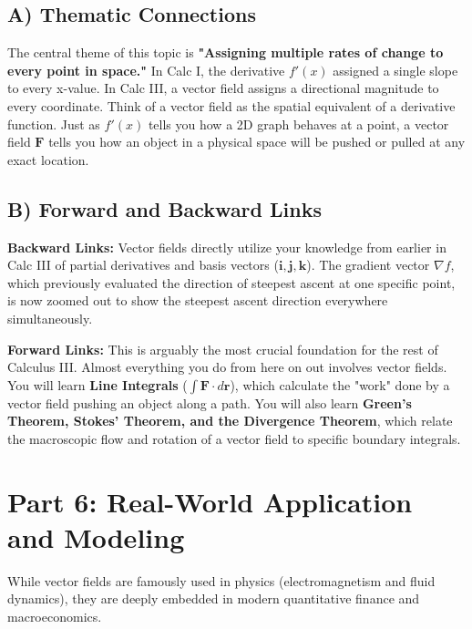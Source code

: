 \documentclass[11pt]{article}
\begin{document}
\subsection{A) Thematic Connections}
The central theme of this topic is \textbf{"Assigning multiple rates of change to every point in space."} 
In Calc I, the derivative $f'(x)$ assigned a single slope to every x-value. In Calc III, a vector field assigns a directional magnitude to every coordinate. Think of a vector field as the spatial equivalent of a derivative function. Just as $f'(x)$ tells you how a 2D graph behaves at a point, a vector field $\mathbf{F}$ tells you how an object in a physical space will be pushed or pulled at any exact location.

\subsection{B) Forward and Backward Links}
\textbf{Backward Links:} Vector fields directly utilize your knowledge from earlier in Calc III of partial derivatives and basis vectors ($\mathbf{i}, \mathbf{j}, \mathbf{k}$). The gradient vector $\nabla f$, which previously evaluated the direction of steepest ascent at one specific point, is now zoomed out to show the steepest ascent direction everywhere simultaneously.

\textbf{Forward Links:} This is arguably the most crucial foundation for the rest of Calculus III. Almost everything you do from here on out involves vector fields. You will learn \textbf{Line Integrals} ($\int \mathbf{F} \cdot d\mathbf{r}$), which calculate the "work" done by a vector field pushing an object along a path. You will also learn \textbf{Green's Theorem, Stokes' Theorem, and the Divergence Theorem}, which relate the macroscopic flow and rotation of a vector field to specific boundary integrals.

\section{Part 6: Real-World Application and Modeling}

While vector fields are famously used in physics (electromagnetism and fluid dynamics), they are deeply embedded in modern quantitative finance and macroeconomics.
\end{document}
